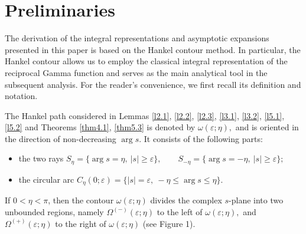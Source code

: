 \documentclass[12pt, reqno]{amsart}
\theoremstyle{definition}
\theoremstyle{remark}
\numberwithin{equation}{section}
\begin{document}
\section{Preliminaries}\label{sec2}

The derivation of the integral representations and asymptotic expansions presented in this paper is based on the Hankel contour method. In particular, the Hankel contour allows us to employ the classical integral representation of the reciprocal Gamma function and serves as the main analytical tool in the subsequent analysis. For the reader's convenience, we first recall its definition and notation.

The Hankel path considered in Lemmas \ref{l2.1}, \ref{l2.2}, \ref{l2.3},
\ref{l3.1}, \ref{l3.2}, \ref{l5.1}, \ref{l5.2} and Theorems
\ref{thm4.1}, \ref{thm5.3} is denoted by
$
\omega(\varepsilon;\eta),
$
and is oriented in the direction of non-decreasing $\arg s$.
It consists of the following parts:
\begin{itemize}
\item[(1)] the two rays
$
S_\eta = \{\arg s = \eta,\ |s| \ge \varepsilon\},
\qquad
S_{-\eta} = \{\arg s = -\eta,\ |s| \ge \varepsilon\};
$

\item[(2)] the circular arc
$
C_\eta(0;\varepsilon)
=
\{|s|=\varepsilon,\ -\eta \le \arg s \le \eta\}.
$
\end{itemize}

If $0<\eta<\pi$, then the contour $\omega(\varepsilon;\eta)$ divides the complex $s$-plane into two unbounded regions, namely
$
\Omega^{(-)}(\varepsilon;\eta)
$ to the left of $ \omega(\varepsilon;\eta),
$
and
$
\Omega^{(+)}(\varepsilon;\eta)$
 to the right of $\omega(\varepsilon;\eta)
$ (see Figure 1).
\end{document}
